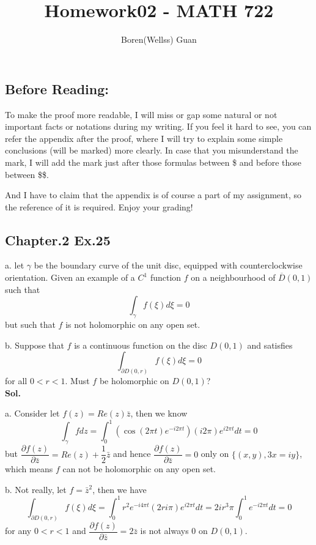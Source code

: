\documentclass[lang=en,11pt,a4paper,citestyle =authoryear]{elegantpaper}
\title{Homework02 - MATH 722}
\author{Boren(Wellss) Guan}
\begin{document}
\maketitle

\subsection*{Before Reading:}\par
To make the proof more readable, I will miss or gap some natural or not important facts or notations during my writing. If you feel it hard to see, you can refer the appendix after the proof, where I will try to explain some simple conclusions (will be marked) more clearly. In case that you misunderstand the mark, I will add the mark just after those formulas between \$ and before those between \$\$.\par
And I have to claim that the appendix is of course a part of my assignment, so the reference of it is required. Enjoy your grading!

\subsection*{Chapter.2 Ex.25} 
a. let $\gamma$ be the boundary curve of the unit disc, equipped with counterclockwise orientation. Given an example of a $C^1$ function $f$ on a neighbourhood of $\overline{D}(0,1)$ such that
\[ \int_{\gamma} f(\xi)d\xi = 0\]
but such that $f$ is not holomorphic on any open set.\par
b. Suppose that $f$ is a continuous function on the disc $D(0,1)$ and satisfies
\[\int_{\partial D(0,r)} f(\xi)d\xi = 0\]
for all $0<r<1$. Must $f$ be holomorphic on $D(0,1)$?\vspace{0.5em}\\
\textbf{Sol.} \par
a. Consider let $f(z) = Re(z)\bar{z}$, then we know
\[
\int_{\gamma} fdz = \int_0^1 (\cos(2\pi t)e^{-i2\pi t})(i2\pi)e^{i2\pi t} dt = 0
\]
but $\dfrac{\partial f(z)}{\partial \bar{z}} = Re(z) + \dfrac{1}{2}\bar{z}$ and hence $\dfrac{\partial f(z)}{\partial \bar{z}} = 0$ only on $\{(x,y), 3x = iy\}$, which means $f$ can not be holomorphic on any open set.
\par
b. Not really, let $f = \bar{z}^2$, then we have
\[
\int_{\partial D(0,r)} f(\xi) d\xi = \int_0^1 r^2e^{-i4\pi t}(2ri\pi)e^{i2\pi t} dt = 2ir^3\pi \int_0^1 e^{-i2\pi t} dt = 0
\]
for any $0< r < 1$ and $\dfrac{\partial f(z)}{\partial \bar{z}} = 2\bar{z}$ is not always $0$ on $D(0,1)$.
\vspace{0.5em}
\end{document}
